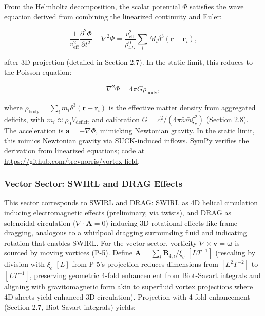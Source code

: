 From the Helmholtz decomposition, the scalar potential $\Phi$ satisfies the wave equation derived from combining the linearized continuity and Euler:

\begin{equation}
\frac{1}{v_{\text{eff}}^2} \frac{\partial^2 \Phi}{\partial t^2} - \nabla^2 \Phi = \frac{v_{\text{eff}}^2}{\rho_{4D}^0} \sum_i \dot{M}_i \delta^3(\mathbf{r} - \mathbf{r}_i),
\end{equation}

after 3D projection (detailed in Section 2.7). In the static limit, this reduces to the Poisson equation:

\begin{equation}
\nabla^2 \Phi = 4\pi G \rho_{\text{body}},
\end{equation}

where $\rho_{\text{body}} = \sum_i m_i \delta^3(\mathbf{r} - \mathbf{r}_i)$ is the effective matter density from aggregated deficits, with $m_i \approx \rho_0 V_{\text{deficit}}$ and calibration $G = c^2 / (4\pi \bar{n} \bar{m} \xi_c^2)$ (Section 2.8). The acceleration is $\mathbf{a} = -\nabla \Phi$, mimicking Newtonian gravity. In the static limit, this mimics Newtonian gravity via SUCK-induced inflows. SymPy verifies the derivation from linearized equations; code at \url{https://github.com/trevnorris/vortex-field}.

\subsubsection{Vector Sector: SWIRL and DRAG Effects}

This sector corresponds to SWIRL and DRAG: SWIRL as 4D helical circulation inducing electromagnetic effects (preliminary, via twists), and DRAG as solenoidal circulation ($\nabla \cdot \mathbf{A} = 0$) inducing 3D rotational effects like frame-dragging, analogous to a whirlpool dragging surrounding fluid and indicating rotation that enables SWIRL. For the vector sector, vorticity $\nabla \times \mathbf{v} = \boldsymbol{\omega}$ is sourced by moving vortices (P-5). Define $\mathbf{A} = \sum_i \mathbf{B}_{4,i} / \xi_c$ $[L T^{-1}]$ (rescaling by division with $\xi_c$ $[L]$ from P-5's projection reduces dimensions from $[L^2 T^{-2}]$ to $[L T^{-1}]$, preserving geometric 4-fold enhancement from Biot-Savart integrals and aligning with gravitomagnetic form akin to superfluid vortex projections where 4D sheets yield enhanced 3D circulation). Projection with 4-fold enhancement (Section 2.7, Biot-Savart integrals) yields:

